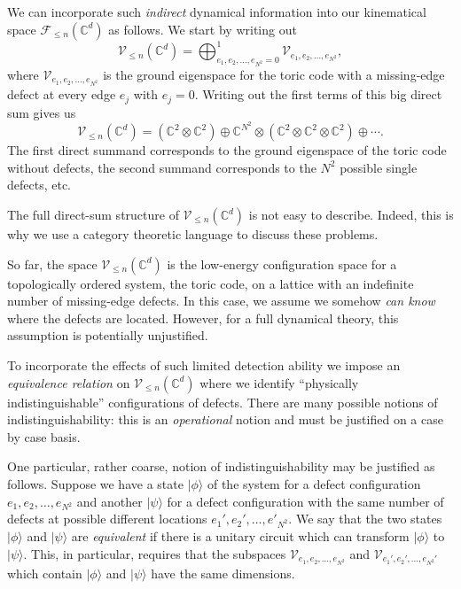 We can incorporate such \emph{indirect} dynamical information into our kinematical space $\mathcal{F}_{\le n}(\mathbb{C}^d)$ as follows. We start by writing out 
\begin{equation}
\mathcal{V}_{\le n}(\mathbb{C}^d) = \bigoplus_{e_1,e_2, \ldots, e_{N^2} =0}^1 \mathcal{V}_{e_1,e_2,\ldots, e_{N^2}},
\end{equation}
where $\mathcal{V}_{e_1,e_2,\ldots, e_{N^2}}$ is the ground eigenspace for the toric code with a missing-edge defect at every edge $e_j$ with $e_j=0$. Writing out the first terms of this big direct sum gives us
\begin{equation}
\mathcal{V}_{\le n}(\mathbb{C}^d) = (\mathbb{C}^2\otimes \mathbb{C}^2)\oplus \mathbb{C}^{N^2}\otimes (\mathbb{C}^2\otimes \mathbb{C}^2\otimes \mathbb{C}^2)\oplus \cdots.
\end{equation}
The first direct summand corresponds to the ground eigenspace of the toric code without defects, the second summand corresponds to the $N^2$ possible single defects, etc.

The full direct-sum structure of $\mathcal{V}_{\le n}(\mathbb{C}^d)$ is not easy to describe. Indeed, this is why we use a category theoretic language to discuss these problems. 

So far, the space $\mathcal{V}_{\le n}(\mathbb{C}^d)$ is the low-energy configuration space for a topologically ordered system, the toric code, on a lattice with an indefinite number of missing-edge defects. In this case, we assume we somehow \emph{can know} where the defects are located. However, for a full dynamical theory, this assumption is potentially unjustified.

To incorporate the effects of such limited detection ability we impose an \emph{equivalence relation} on $\mathcal{V}_{\le n}(\mathbb{C}^d)$ where we identify ``physically indistinguishable'' configurations of defects. There are many possible notions of indistinguishability: this is an \emph{operational} notion and must be justified on a case by case basis. 

One particular, rather coarse, notion of indistinguishability may be justified as follows. Suppose we have a state $|\phi\rangle$ of the system for a defect configuration $e_1,e_2, \ldots, e_{N^2}$ and another $|\psi\rangle$ for a defect configuration with the same number of defects at possible different locations $e_1',e_2',\ldots, e'_{N^2}$. We say that the two states $|\phi\rangle$ and $|\psi\rangle$ are \emph{equivalent} if there is a unitary circuit which can transform $|\phi\rangle$ to $|\psi\rangle$. This, in particular, requires that the subspaces $\mathcal{V}_{e_1,e_2,\ldots,e_{N^2}}$ and $\mathcal{V}_{e_1',e_2',\ldots,e_{N^2}'}$ which contain $|\phi\rangle$ and $|\psi\rangle$ have the same dimensions.

